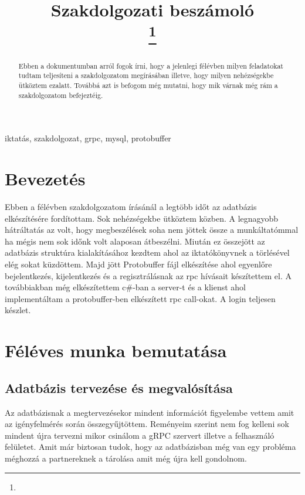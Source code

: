 \documentclass[conference]{IEEEtran}
\begin{document}
\title{Szakdolgozati beszámoló\\

\thanks{}
}

\author{
}

\maketitle

\begin{abstract}
Ebben a dokumentumban arról fogok írni, hogy a jelenlegi félévben milyen feladatokat tudtam teljesíteni a szakdolgozatom megírásában illetve, hogy milyen nehézségekbe ütköztem ezalatt. Továbbá azt is befogom még mutatni, hogy mik várnak még rám a szakdolgozatom befejeztéig. 
\end{abstract}

\begin{IEEEkeywords}
iktatás, szakdolgozat, grpc, mysql, protobuffer
\end{IEEEkeywords}

\section{Bevezetés}
Ebben a félévben szakdolgozatom írásánál a legtöbb időt az adatbázis elkészítésére fordítottam. Sok nehézségekbe ütköztem közben. A legnagyobb hátráltatás az volt, hogy megbeszélések soha nem jöttek össze a munkáltatómmal ha mégis nem sok időnk volt alaposan átbeszélni. Miután ez összejött az adatbázis struktúra kialakításához kezdtem ahol az iktatókönyvnek a törlésével elég sokat küzdöttem. Majd jött Protobuffer fájl elkészítése ahol egyenlőre bejelentkezés, kijelentkezés és a regisztrálásnak az rpc hívásait készítettem el. A továbbiakban még elkészítettem c\#-ban a server-t és a klienst ahol implementáltam a protobuffer-ben elkészített rpc call-okat. A login teljesen készlet. 
\section{Féléves munka bemutatása}

\subsection{\textbf{Adatbázis tervezése és megvalósítása}}
Az adatbázisnak a megtervezésekor mindent információt figyelembe vettem amit az igényfelmérés során összegyűjtöttem. Reményeim szerint nem fog kelleni sok mindent újra tervezni mikor csinálom a gRPC szervert illetve a felhasználó felületet. Amit már biztosan tudok, hogy az adatbázisban még van egy probléma méghozzá a partnereknek a tárolása amit még újra kell gondolnom.
\\
\end{document}

